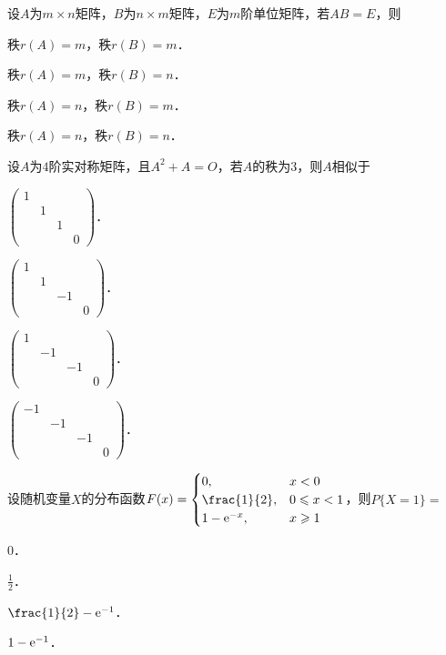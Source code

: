 \documentclass[plain,noanswer,medmath]{../../template/jnuexam}
\begin{document}
\begin{problem}
设$A$为$m \times n$矩阵，$B$为$n \times m$矩阵，$E$为$m$阶单位矩阵，若$AB = E$，则\pickout{}
\begin{abcd}
\item 秩$r(A) = m$，秩$r(B) = m$．
\item 秩$r(A) = m$，秩$r(B) = n$．
\item 秩$r(A) = n$，秩$r(B) = m$．
\item 秩$r(A) = n$，秩$r(B) = n$．
\end{abcd}
\end{problem}


\begin{problem}
设$A$为$4$阶实对称矩阵，且$A^2 + A = O$，若$A$的秩为$3$，则$A$相似于\pickout{}
\begin{abcd}
\item $\begin{pmatrix}
  1 &   &   & \\
    & 1 &   & \\
    &   & 1 & \\
    &   &   & 0
\end{pmatrix}$．
\item $\begin{pmatrix}
  1 &   &    & \\
    & 1 &    & \\
    &   & -1 & \\
    &   &    & 0
\end{pmatrix}$．
\item $\begin{pmatrix}
  1 &    &    & \\
    & -1 &    & \\
    &    & -1 & \\
    &    &    & 0
\end{pmatrix}$．
\item $\begin{pmatrix}
  -1 &    &    & \\
     & -1 &    & \\
     &    & -1 & \\
     &    &    & 0
\end{pmatrix}$．
\end{abcd}
\end{problem}


\begin{problem}
设随机变量$X$的分布函数$F(x) = \begin{cases}
             0, & x < 0 \\
   \frac{1}{2}, & 0 \le x < 1 \\
  1 - \e^{- x}, & x \ge 1
\end{cases}$，则$P\{X = 1\} =$\pickout{}
\begin{abcd}
\item $0$．
\item $\frac{1}{2}$．
\item $\frac{1}{2} - \e^{-1}$．
\item $1 - \mathrm{e}^{-1}$．
\end{abcd}
\end{problem}
\end{document}
